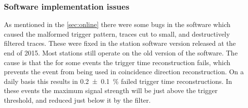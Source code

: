 \subsubsection{Software implementation issues}

As mentioned in the \cref{sec:online} there were some bugs in the software which caused the malformed trigger pattern, traces cut to small, and destructively filtered traces. These were fixed in the \hisparc station software version released at the end of 2015. Most stations still operate on the old version of the software. The cause is that the for some events the trigger time reconstruction fails, which prevents the event from being used in coincidence direction reconstruction. On a daily basis this results in \SI{0.2 \pm 0.1}{\percent} failed trigger time reconstructions. In these events the maximum signal strength will be just above the trigger threshold, and reduced just below it by the filter.
